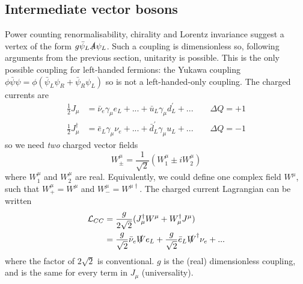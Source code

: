 \documentclass[a4paper,12pt]{article}
\begin{document}
\subsection{Intermediate vector bosons}
%
Power counting renormalisability, chirality and Lorentz invariance suggest a vertex of the form $g\bar{\psi}_L\slashed{A}\psi_L$. Such a coupling is dimensionless so, following arguments from the previous section, unitarity is possible. This is the only possible coupling for left-handed fermions: the Yukawa coupling $\phi \bar{\psi}\psi = \phi(\bar{\psi}_L\psi_R + \bar{\psi}_R\psi_L)$ so is not a left-handed-only coupling. The charged currents are
\begin{equation}
\begin{split}
\frac{1}{2}J_\mu &= \bar{\nu}_e\gamma_\mu e_L + ... + \bar{u}_L \gamma_\mu d^\prime_L + ... \qquad \Delta Q = +1 \\
\frac{1}{2}J_\mu^\dagger &= \bar{e}_L \gamma_\mu \nu_e + ... + \bar{d}^\prime_L \gamma_\mu u_L + ... \qquad \Delta Q = -1
\end{split}
\end{equation}
so we need \textit{two} charged vector fields 
\begin{equation}
W_\pm^\mu = \frac{1}{\sqrt{2}} (W_1^\mu \pm i W_2^\mu)
\end{equation}
where $W_1^\mu$ and $W_2^\mu$ are real. Equivalently, we could define one complex field $W^\mu$, such that $W_+^\mu = W^\mu$ and $W_-^\mu = W^{\mu \dagger}$. The charged current Lagrangian can be written
\begin{equation}
\begin{split}
\mathcal{L}_{CC} &= \frac{g}{2\sqrt{2}}(J_\mu^\dagger W^\mu + W_\mu^\dagger J^\mu) \\
&= \frac{g}{\sqrt{2}}\bar{\nu}_e \slashed{W} e_L + \frac{g}{\sqrt{2}}\bar{e}_L \slashed{W}^\dagger \nu_e + ...
\end{split}
\end{equation}
where the factor of $2\sqrt{2}$ is conventional. $g$ is the (real) dimensionless coupling, and is the same for every term in $J_\mu$ (universality). 
\end{document}
